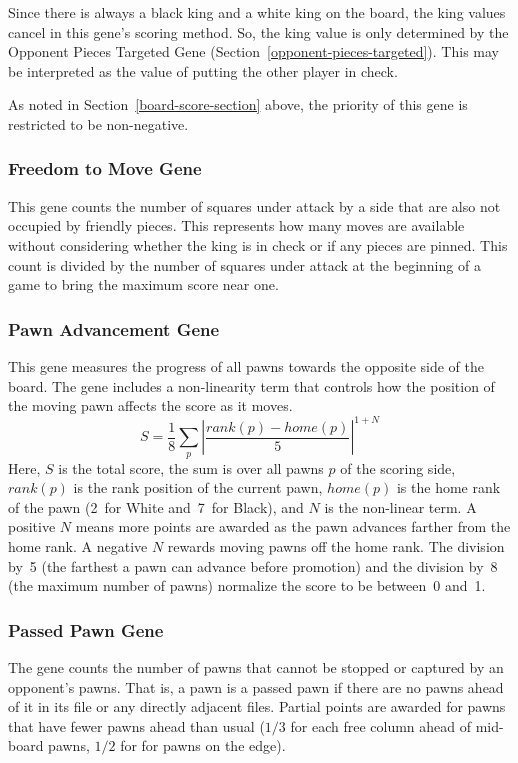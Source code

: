 \documentclass[letterpaper]{article}
\renewcommand{\_}{\allowbreak\textunderscore\allowbreak}
\begin{document}
Since there is always a black king and a white king on the board, the king values cancel in this gene's scoring method. So, the king value is only determined by the Opponent Pieces Targeted Gene (Section~\ref{opponent-pieces-targeted}). This may be interpreted as the value of putting the other player in check.

As noted in Section~\ref{board-score-section} above, the priority of this gene is restricted to be non-negative.

\subsubsection{Freedom to Move Gene}
This gene counts the number of squares under attack by a side that are also not occupied by friendly pieces. This represents how many moves are available without considering whether the king is in check or if any pieces are pinned. This count is divided by the number of squares under attack at the beginning of a game to bring the maximum score near one.

\subsubsection{Pawn Advancement Gene}
This gene measures the progress of all pawns towards the opposite side of the board. The gene includes a non-linearity term that controls how the position of the moving pawn affects the score as it moves.
\[S = \frac{1}{8}\sum_p \left|\frac{rank(p) - home(p)}{5}\right|^{1 + N}\]
Here, \(S\) is the total score, the sum is over all pawns \(p\) of the scoring side, \(rank(p)\) is the rank position of the current pawn, \(home(p)\) is the home rank of the pawn (2~for White and~7~for Black), and \(N\) is the non-linear term. A positive \(N\) means more points are awarded as the pawn advances farther from the home rank. A negative \(N\) rewards moving pawns off the home rank. The division by~5 (the farthest a pawn can advance before promotion) and the division by~8 (the maximum number of pawns) normalize the score to be between~0 and~1.

\subsubsection{Passed Pawn Gene}
The gene counts the number of pawns that cannot be stopped or captured by an opponent's pawns. That is, a pawn is a passed pawn if there are no pawns ahead of it in its file or any directly adjacent files. Partial points are awarded for pawns that have fewer pawns ahead than usual (\(1/3\) for each free column ahead of mid-board pawns, \(1/2\) for for pawns on the edge).
\end{document}
